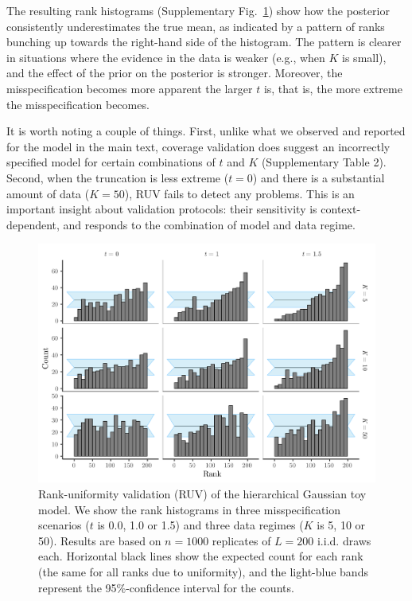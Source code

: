 \documentclass[oneside]{article}
\begin{document}
The resulting rank histograms (Supplementary Fig.~\ref{supfig:ruv_normal_toy}) show how the posterior consistently underestimates the true mean, as indicated by a pattern of ranks bunching up towards the right-hand side of the histogram.
The pattern is clearer in situations where the evidence in the data is weaker (e.g., when $K$ is small), and the effect of the prior on the posterior is stronger.
Moreover, the misspecification becomes more apparent the larger $t$ is, that is, the more extreme the misspecification becomes.

It is worth noting a couple of things.
First, unlike what we observed and reported for the model in the main text, coverage validation does suggest an incorrectly specified model for certain combinations of $t$ and $K$ (Supplementary Table 2).
Second, when the truncation is less extreme ($t = 0$) and there is a substantial amount of data ($K = 50$), RUV fails to detect any problems.
This is an important insight about validation protocols: their sensitivity is context-dependent, and responds to the combination of model and data regime.

\begin{figure}[!ht]
   \includegraphics[width=\linewidth]{../figures/sbc_normal_manual.pdf}
  \caption{Rank-uniformity validation (RUV) of the hierarchical Gaussian toy model.
  We show the rank histograms in three misspecification scenarios ($t$
  is 0.0, 1.0 or 1.5) and three data regimes ($K$ is 5, 10 or 50).
  Results are based on $n=1000$ replicates of $L= 200$ i.i.d. draws each.
  Horizontal black lines show the expected count for each rank (the same for all ranks due to uniformity), and the light-blue bands represent the 95\%-confidence interval for the counts.
    }
  \label{supfig:ruv_normal_toy}
\end{figure}
\end{document}
